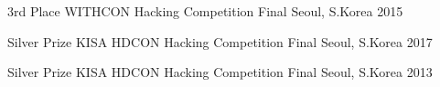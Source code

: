 \cvsubsection{\textcolor{red}{Honors}}


\begin{cvhonors}

  \cvhonor
    {3rd Place} %
    {WITHCON Hacking Competition Final} %
    {Seoul, S.Korea} %
    {2015} %

  \cvhonor
    {Silver Prize} %
    {KISA HDCON Hacking Competition Final} %
    {Seoul, S.Korea} %
    {2017} %

  \cvhonor
    {Silver Prize} %
    {KISA HDCON Hacking Competition Final} %
    {Seoul, S.Korea} %
    {2013} %

\end{cvhonors}

